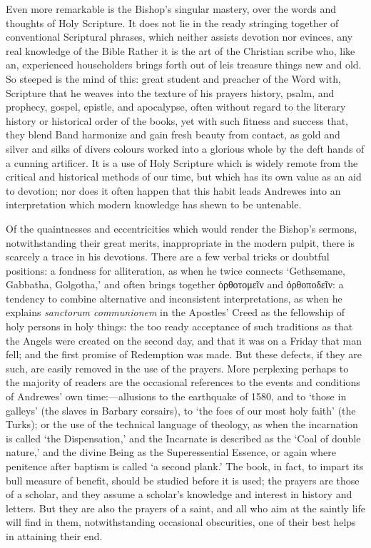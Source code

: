 Even more remarkable is the Bishop’s singular mastery, over the words and thoughts of Holy Scripture. It does not lie in the ready stringing together of conventional Scriptural phrases, which neither assists devotion nor evinces, any real knowledge of the Bible Rather it is the art of the Christian scribe who, like an, experienced householders brings forth out of leis treasure things new and old. So steeped is the mind of this: great student and preacher of the Word with,  Scripture that he weaves into the texture of his prayers history, psalm, and prophecy, gospel, epistle, and apocalypse, often without regard to the literary history or historical order of the books, yet with such fitness and success that, they blend Band harmonize and gain fresh beauty from contact, as gold and silver and silks of divers colours worked into a glorious whole by the deft hands of a cunning artificer. It is a use of Holy Scripture which is widely remote from the critical and historical methods of our time, but which has its own value as an aid to devotion; nor does it often happen that this habit leads Andrewes into an interpretation which modern knowledge has shewn to be untenable.

Of the quaintnesses and eccentricities which would render the Bishop's sermons, notwithstanding their great merits, inappropriate in the modern pulpit, there is scarcely a trace in his devotions. There are a few verbal tricks or doubtful positions: a fondness for alliteration, as when he twice connects  ‘Gethsemane, Gabbatha, Golgotha,’ and often brings together \textgreek{ὀρθοτομεῖν} and \textgreek{ὀρθοποδεῖν}: a tendency to combine alternative and inconsistent interpretations, as when he explains \emph{sanctorum communionem} in the Apostles’ Creed as the fellowship of holy persons in holy things: the too ready acceptance of such traditions as that the Angels were created on the second day, and that it was on a Friday that man fell; and the first promise of Redemption was made. But these defects, if they are such, are easily removed in the use of the prayers. More perplexing perhaps to the majority of readers are the occasional references to the events and conditions of Andrewes’ own time:—allusions to the earthquake of 1580, and to ‘those in galleys’ (the slaves in Barbary corsairs), to ‘the foes of our most holy faith’ (the Turks); or the use of the technical language of theology, as when the incarnation is called ‘the Dispensation,’ and the Incarnate is described as the ‘Coal of double nature,’ and the divine Being as the Superessential Essence, or again where penitence after baptism is called ‘a second plank.’ The book, in fact, to impart its bull measure of benefit, should be studied before it is used; the prayers are those of a scholar, and they assume a scholar’s knowledge and interest in history and letters. But they are also the prayers of a saint, and all who aim at the saintly life will find in them, notwithstanding occasional obscurities, one of their best helps in attaining their end.

